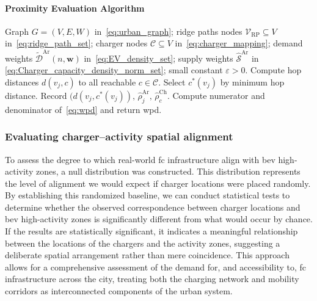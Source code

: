 \paragraph{Proximity Evaluation Algorithm}
\label{subsubsec:wpd_algorithm}

\begin{algorithm}[H]
\caption{Computation of \gls{wpd}}
\label{alg:wpd}
\begin{algorithmic}[1]
\REQUIRE Graph $G=(V,E, W)$ in~\eqref{eq:urban_graph}; ridge paths nodes $\mathcal{V}_{\mathrm{RP}}\subseteq V$ in~\eqref{eq:ridge_path_set}; charger nodes $\mathcal{C}\subseteq V$ in~\eqref{eq:charger_mapping};
demand weights $\widetilde{\mathcal{D}}^{\mathrm{Ar}}(n,\mathbf{w})$ in~\eqref{eq:EV_density_set}; supply weights $\widehat{\mathcal{S}}^{\mathrm{Ar}}$ in \eqref{eq:Charger_capacity_density_norm_set}; small constant $\varepsilon>0$.
  \STATE Compute hop distances $d(v_j,c)$ to all reachable $c \in \mathcal{C}$.
  \STATE Select $c^*(v_j)$ by minimum hop distance.
  \STATE Record $(d(v_j,c^*(v_j)),\, \widehat{\rho}^{\mathrm{Ar}}_j,\, \widehat{\rho}^{\mathrm{Ch}}_c$.
\ENDFOR
\STATE Compute numerator and denominator of~\eqref{eq:wpd} and return \gls{wpd}.
\end{algorithmic}
\end{algorithm}

\subsubsection{Evaluating charger–activity spatial alignment}
\label{subsec:null_distribution}
To assess the degree to which real-world \gls{fc} infrastructure align with \gls{bev} high-activity zones, a null distribution was constructed.
This distribution represents the level of alignment we would expect if charger locations were placed randomly. By establishing this randomized baseline, we can conduct statistical tests to determine whether the observed correspondence between charger locations and \gls{bev} high-activity zones is significantly different from what would occur by chance. If the results are statistically significant, it indicates a meaningful relationship between the locations of the chargers and the activity zones, suggesting a deliberate spatial arrangement rather than mere coincidence. This approach allows for a comprehensive assessment of the demand for, and accessibility to, \gls{fc} infrastructure across the city, treating both the charging network and mobility corridors as interconnected components of the urban system.


